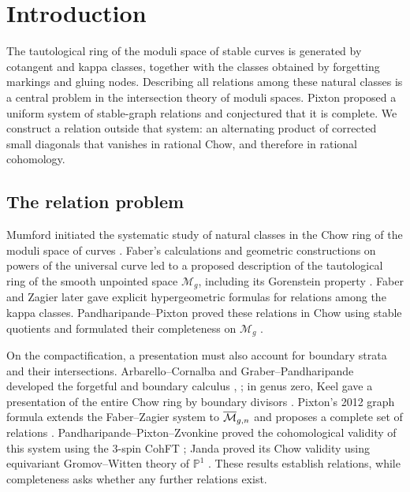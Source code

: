 \section{Introduction}\label{sec:introduction}

The tautological ring of the moduli space of stable curves is generated
by cotangent and kappa classes, together with the classes obtained by
forgetting markings and gluing nodes. Describing all relations among
these natural classes is a central problem in the intersection theory
of moduli spaces. Pixton proposed a uniform system of stable-graph
relations and conjectured that it is complete. We construct a relation
outside that system: an alternating product of corrected small diagonals
that vanishes in rational Chow, and therefore in rational cohomology.

\subsection{The relation problem}

Mumford initiated the systematic study of natural classes in the Chow
ring of the moduli space of curves \cite[Sections~4--5]{Mumford1983}.
Faber's calculations and geometric constructions on powers of the
universal curve led to a proposed description of the tautological ring
of the smooth unpointed space \(\mathcal M_g\), including its Gorenstein
property \cite[Conjectures~1--2]{Faber1999}. Faber and Zagier later gave
explicit hypergeometric formulas for relations among the kappa classes.
Pandharipande--Pixton proved these relations in Chow using stable
quotients and formulated their completeness on \(\mathcal M_g\)
\cite[Theorem~1 and Conjecture~2]{PandharipandePixton2021}.

On the compactification, a presentation must also account for boundary
strata and their intersections. Arbarello--Cornalba and
Graber--Pandharipande developed the forgetful and boundary calculus
\cite[Section~1]{ArbarelloCornalba1996},
\cite[Appendix~A]{GraberPandharipande2003}; in genus zero, Keel gave a
presentation of the entire Chow ring by boundary divisors
\cite[Section~4, Theorem~1]{Keel1992}.
Pixton's 2012 graph formula extends the Faber--Zagier system to
\(\overline{\mathcal M}_{g,n}\) and proposes a complete set of relations
\cite[Sections~1--3, Conjecture~2]{Pixton}.
Pandharipande--Pixton--Zvonkine proved the cohomological validity of this
system using the \(3\)-spin CohFT \cite{PPZ}; Janda proved its Chow
validity using equivariant Gromov--Witten theory of \(\mathbb P^1\)
\cite{Janda}. These results establish relations, while completeness asks
whether any further relations exist.

